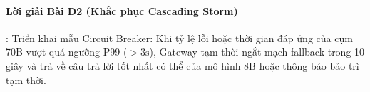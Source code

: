 \paragraph{Lời giải Bài D2 (Khắc phục Cascading Storm)}:
Triển khai mẫu Circuit Breaker: Khi tỷ lệ lỗi hoặc thời gian đáp ứng của cụm 70B vượt quá ngưỡng P99 ($> 3\text{s}$), Gateway tạm thời ngắt mạch fallback trong 10 giây và trả về câu trả lời tốt nhất có thể của mô hình 8B hoặc thông báo bảo trì tạm thời.
